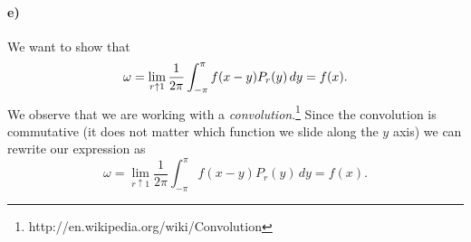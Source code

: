 \documentclass[a4paper]{article}
\begin{document}
\paragraph{e)}
  
We want to show that 
\begin{equation}
  \notag
  \omega = \lim\limits_{r\uparrow 1} \frac{1}{2\pi}\int_{-\pi}^{\pi}f(x-y)P_r(y) \, dy = f(x).
\end{equation}
We observe that we are working with a \textit{convolution}.\footnote{http://en.wikipedia.org/wiki/Convolution}
Since the convolution is commutative (it does not matter which function we slide along the $y$ axis) we can rewrite our expression as
\begin{equation}
  \omega = \lim\limits_{r\uparrow 1} \frac{1}{2\pi}\int_{-\pi}^{\pi}f(x-y)P_r(y) \, dy = f(x).
\end{equation}
\end{document}
